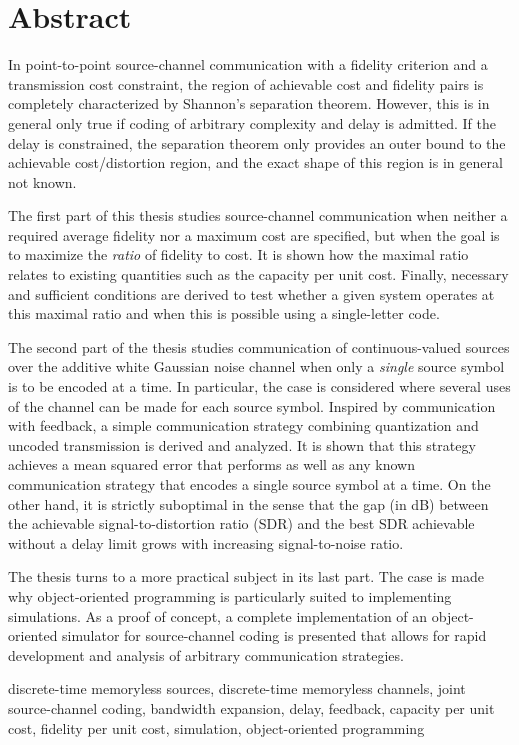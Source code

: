 \chapter*{Abstract}
\nocite{KleinerR2009a}



In point-to-point source-channel communication with a fidelity criterion and a
transmission cost constraint, the region of achievable cost and fidelity pairs
is completely characterized by Shannon's separation theorem. However, this is in
general only true if coding of arbitrary complexity and delay is admitted. If
the delay is constrained, the separation theorem only provides an outer bound to
the achievable cost\slash distortion region, and the exact shape of this region
is in general not known.

The first part of this thesis studies source-channel communication when neither
a required average fidelity nor a maximum cost are specified, but when the goal
is to maximize the \emph{ratio} of fidelity to cost. It is shown how the
maximal ratio relates to existing quantities such as the capacity per unit cost.
Finally, necessary and sufficient conditions are derived to test whether a given
system operates at this maximal ratio and when this is possible using a
single-letter code. 

The second part of the thesis studies communication of continuous-valued
sources over the additive white Gaussian noise channel when only a \emph{single}
source symbol is to be encoded at a time. In particular, the case is considered
where several uses of the channel can be made for each source symbol. Inspired
by communication with feedback, a simple communication strategy combining
quantization and uncoded transmission is derived and analyzed. It is shown that
this strategy achieves a mean squared error that performs as well as any known
communication strategy that encodes a single source symbol at a time. On the
other hand, it is strictly suboptimal in the sense that the gap (in dB) between
the achievable signal-to-distortion ratio (SDR) and the best SDR achievable
without a delay limit grows with increasing signal-to-noise ratio. 

The thesis turns to a more practical subject in its last part. The case is made
why object-oriented programming is particularly suited to implementing
simulations. As a proof of concept, a complete implementation of an
object-oriented simulator for source-channel coding is presented that allows for
rapid development and analysis of arbitrary communication strategies.

\begin{keywords}
  discrete-time memoryless sources, discrete-time memoryless channels, joint
  source-channel coding, bandwidth expansion, delay, feedback, capacity per
  unit cost, fidelity per unit cost, simulation, object-oriented programming
\end{keywords}
